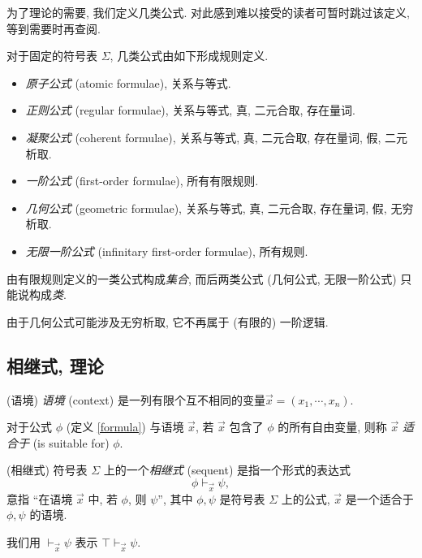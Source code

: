 为了理论的需要, 我们定义几类公式. 对此感到难以接受的读者可暂时跳过该定义, 等到需要时再查阅.

\begin{definition}
	[label={kinds-of-formulae}]
	{}
	对于固定的符号表 $\Sigma$,
	几类公式由如下形成规则定义.
	\begin{itemize}
		\item \emph{原子公式} (atomic formulae), 关系与等式.
		\item \emph{正则公式} (regular formulae), 关系与等式, 真, 二元合取, 存在量词.
		\item \emph{凝聚公式} (coherent formulae), 关系与等式, 真, 二元合取, 存在量词, 假, 二元析取.
		\item \emph{一阶公式} (first-order formulae), 所有有限规则.
		\item \emph{几何公式} (geometric formulae), 关系与等式, 真, 二元合取, 存在量词, 假, 无穷析取.
		\item \emph{无限一阶公式} (infinitary first-order formulae), 所有规则.
	\end{itemize}
\end{definition}



\begin{remark}
	{}
	由有限规则定义的一类公式构成\emph{集合}, 而后两类公式 (几何公式, 无限一阶公式) 只能说构成\emph{类}.
	
	由于几何公式可能涉及无穷析取, 它不再属于 (有限的) 一阶逻辑.
\end{remark}

\subsection{相继式, 理论}

\begin{definition}
	{(语境)}
	\emph{语境} (context) 是一列有限个互不相同的变量\footnotemark $\vec x = (x_1,\cdots,x_n)$.
	
	对于公式 $\phi$ (定义 \ref{formula}) 与语境 $\vec x$, 若 $\vec x$ 包含了 $\phi$ 的所有自由变量, 则称 $\vec x$ \emph{适合于} (is suitable for) $\phi$.
\end{definition}


\begin{definition}
	[label={sequents}]
	{(相继式)}
	符号表 $\Sigma$ 上的一个\emph{相继式} (sequent) 是指一个形式的表达式
	$$
	\phi \vdash_{\vec x} \psi,
	$$
	意指 ``在语境 $\vec x$ 中, 若 $\phi$, 则 $\psi$'', 其中 $\phi,\psi$ 是符号表 $\Sigma$ 上的公式,
	$\vec x$ 是一个适合于 $\phi,\psi$ 的语境.
	
	我们用 $\vdash_{\vec x} \psi$ 表示 $\top\vdash_{\vec x} \psi$.
\end{definition}


